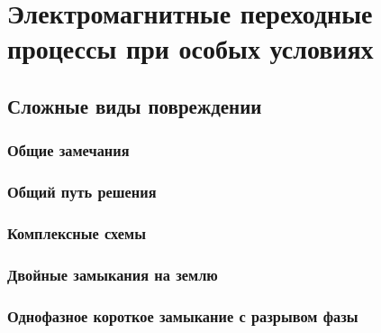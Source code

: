 \part{Электромагнитные переходные процессы при особых условиях}

\chapter{Сложные виды повреждении}
\label{chap:16}

\section{Общие замечания}
\label{sec:16-1}


\section{Общий путь решения}
\label{sec:16-2}


\section{Комплексные схемы}
\label{sec:16-3}


\section{Двойные замыкания на землю}
\label{sec:16-4}


\section{Однофазное короткое замыкание с разрывом фазы}
\label{sec:16-5}